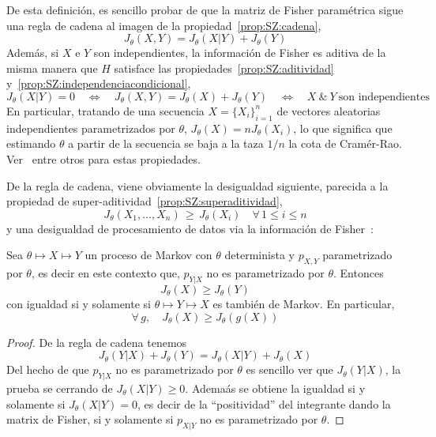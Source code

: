 De  esta  definici\'on,   es  sencillo  probar  de  que   la  matriz  de  Fisher
param\'etrica    sigue    una   regla    de    cadena    al    imagen   de    la
propiedad~\ref{prop:SZ:cadena},
%
\[
J_\theta(X,Y) = J_\theta(X|Y) + J_\theta(Y)
\]
%
Adem\'as, si $X$ e $Y$ son independientes, la informaci\'on de Fisher es aditiva
de la  misma manera  que $H$ satisface  las propiedades~\ref{prop:SZ:aditividad}
y~\ref{prop:SZ:independenciacondicional}, \ie
%
\[
J_\theta(X|Y)  = 0  \quad \Leftrightarrow  \quad J_\theta(X,Y)  =  J_\theta(X) +
J_\theta(Y)   \quad  \Leftrightarrow   \quad  X   \:  \&   \:  Y   \:  \mbox{son
  independientes}
\]
%
En particular,  tratando de una  secuencia $X =  \{ X_i \}_{i=1}^n$  de vectores
aleatorias  independientes   parametrizados  por  $\theta$,   $J_\theta(X)  =  n
J_\theta(X_i)$, lo que significa que estimando $\theta$ a partir de la secuencia
se  baja a la  taza $1/n$  la cota  de Cram\'er-Rao.  Ver~\cite{Fis25:07, Sta59,
  Kay93, KagSmi99, Joh04, CovTho06, Rio07} entre otros para estas propiedades.

De la regla de cadena, viene  obviamente la desigualdad siguiente, parecida a la
propiedad de super-aditividad~\ref{prop:SZ:superaditividad},
%
\[
J_\theta(X_1,\ldots,X_n) \, \ge \,  J_\theta(X_i) \quad \forall \, 1 \le i \le n
\]
%
y  una   desigualdad  de  procesamiento   de  datos  via  la   informaci\'on  de
Fisher~\cite{Zam98, Rio07, CovTho06, Fri04, KagSmi99}:
%
\begin{teorema}
  Sea  $\theta  \mapsto  X  \mapsto   Y$  un  proceso  de  Markov  con  $\theta$
  determinista y $p_{X,Y}$ parametrizado por $\theta$, es decir en este contexto
  que, $p_{Y|X}$ no es parametrizado por $\theta$. Entonces
  \[
  J_\theta(X) \ge J_\theta(Y)
  \]
  con igualdad si y solamente si $\theta \mapsto Y \mapsto X$ es tambi\'en
  de Markov. En  particular,
  \[
  \forall \, g, \quad J_\theta(X) \ge J_\theta(g(X))
  \]
\end{teorema}
%
\begin{proof}
  De la regla de cadena tenemos
  \[
  J_\theta(Y|X) + J_\theta(Y) = J_\theta(X|Y) + J_\theta(X)
  \]
  Del hecho  de que $p_{Y|X}$ no  es parametrizado por $\theta$  es sencillo ver
  que $J_\theta(Y|X)$, la prueba se cerrando de $J_\theta(X|Y) \ge 0$. Adema\'as
  se obtiene la igualdad  si y solamente si $J_\theta(X|Y) = 0$,  es decir de la
  ``positividad'' del  integrante dando la matrix  de Fisher, si  y solamente si
  $p_{X|Y}$ no es parametrizado por $\theta$.
\end{proof}

